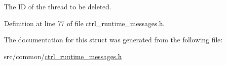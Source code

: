 The I\-D of the thread to be deleted. 



Definition at line 77 of file ctrl\-\_\-runtime\-\_\-messages.\-h.



The documentation for this struct was generated from the following file\-:\begin{DoxyCompactItemize}
\item 
src/common/\hyperlink{ctrl__runtime__messages_8h}{ctrl\-\_\-runtime\-\_\-messages.\-h}\end{DoxyCompactItemize}
